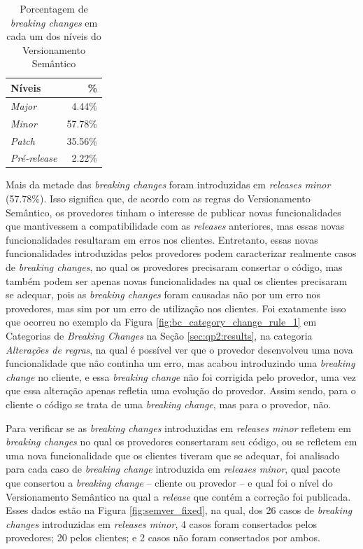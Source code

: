 \begin{table}[]
\centering
\begin{tabular}{lr}
\toprule
\textbf{Níveis}      & \textbf{\%} \\ \hline
\textit{Major}       & 4.44\%      \\
\textit{Minor}       & 57.78\%     \\
\textit{Patch}       & 35.56\%     \\
\textit{Pré-release} & 2.22\%      \\ \bottomrule
\end{tabular}
\caption{Porcentagem de \textit{breaking changes} em cada um dos níveis do Versionamento Semântico}
\label{tab:semver_levels}
\end{table}

Mais da metade das \textit{breaking changes} foram introduzidas em \textit{releases minor} (57.78\%). Isso significa que, de acordo com as regras do Versionamento Semântico, os provedores tinham o interesse de publicar novas funcionalidades que mantivessem a compatibilidade com as \textit{releases} anteriores, mas essas novas funcionalidades resultaram em erros nos clientes. Entretanto, essas novas funcionalidades introduzidas pelos provedores podem caracterizar realmente casos de \textit{breaking changes}, no qual os provedores precisaram consertar o código, mas também podem ser apenas novas funcionalidades na qual os clientes precisaram se adequar, pois as \textit{breaking changes} foram causadas não por um erro nos provedores, mas sim por um erro de utilização nos clientes.
Foi exatamente isso que ocorreu no exemplo da Figura \ref{fig:bc_category_change_rule_1} em Categorias de \textit{Breaking Changes} na Seção \ref{sec:qp2:results}, na categoria \textit{Alterações de regras}, na qual é possível ver que o provedor desenvolveu uma nova funcionalidade que não continha um erro, mas acabou introduzindo uma \textit{breaking change} no cliente, e essa \textit{breaking change} não foi corrigida pelo provedor, uma vez que essa alteração apenas refletia uma evolução do provedor. Assim sendo, para o cliente o código se trata de uma \textit{breaking change}, mas para o provedor, não.

Para verificar se as \textit{breaking changes} introduzidas em \textit{releases minor} refletem em \textit{breaking changes} no qual os provedores consertaram seu código, ou se refletem em uma nova funcionalidade que os clientes tiveram que se adequar, foi analisado para cada caso de \textit{breaking change} introduzida em \textit{releases minor}, qual pacote que consertou a \textit{breaking change} -- cliente ou provedor -- e qual foi o nível do Versionamento Semântico na qual a \textit{release} que contém a correção foi publicada. Esses dados estão na Figura \ref{fig:semver_fixed}, na qual, dos 26 casos de \textit{breaking changes} introduzidas em \textit{releases minor}, 4 casos foram consertados pelos provedores; 20 pelos clientes; e 2 casos não foram consertados por ambos.

